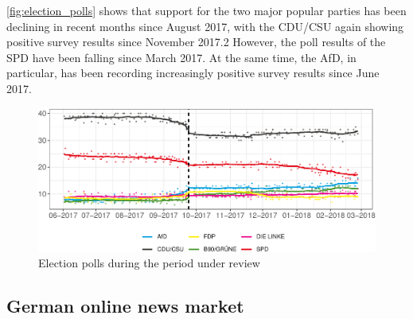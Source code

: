 \documentclass[
  12pt,
]{article}
\begin{document}
\autoref{fig:election_polls} shows that support for the two major
popular parties has been declining in recent months since August 2017,
with the CDU/CSU again showing positive survey results since November
2017.2 However, the poll results of the SPD have been falling since
March 2017. At the same time, the AfD, in particular, has been recording
increasingly positive survey results since June 2017.

\begin{figure}

{\centering \includegraphics[width=0.8\linewidth]{main_text_files/figure-latex/election polls-1} 

}

\caption{Election polls during the period under review \label{fig:election_polls}}\label{fig:election polls}
\end{figure}

\hypertarget{german-online-news-market}{%
\subsection{German online news market}\label{german-online-news-market}}
\end{document}
